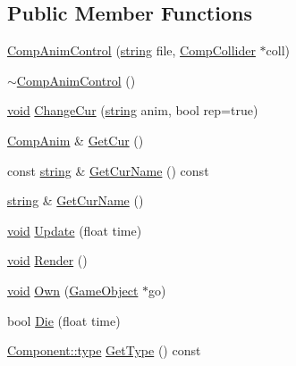 \subsection*{Public Member Functions}
\begin{DoxyCompactItemize}
\item 
\hyperlink{class_comp_anim_control_a973d5ec96115727a84968388bcbe7b7c}{Comp\-Anim\-Control} (\hyperlink{_s_d_l__opengl__glext_8h_ae84541b4f3d8e1ea24ec0f466a8c568b}{string} file, \hyperlink{class_comp_collider}{Comp\-Collider} $\ast$coll)
\item 
\hyperlink{class_comp_anim_control_a6786dbe926d75c85dd4e8bc89ba6525a}{$\sim$\-Comp\-Anim\-Control} ()
\item 
\hyperlink{_s_d_l__opengles2__gl2ext_8h_ae5d8fa23ad07c48bb609509eae494c95}{void} \hyperlink{class_comp_anim_control_a34e3519f9bedde639fdd4342da644d51}{Change\-Cur} (\hyperlink{_s_d_l__opengl__glext_8h_ae84541b4f3d8e1ea24ec0f466a8c568b}{string} anim, bool rep=true)
\item 
\hyperlink{class_comp_anim}{Comp\-Anim} \& \hyperlink{class_comp_anim_control_af094714708b9851b117dd6e3d837213b}{Get\-Cur} ()
\item 
const \hyperlink{_s_d_l__opengl__glext_8h_ae84541b4f3d8e1ea24ec0f466a8c568b}{string} \& \hyperlink{class_comp_anim_control_aab22a377f8848fe448d801e4d23266f2}{Get\-Cur\-Name} () const 
\item 
\hyperlink{_s_d_l__opengl__glext_8h_ae84541b4f3d8e1ea24ec0f466a8c568b}{string} \& \hyperlink{class_comp_anim_control_a4d1597b040731483f5d744feac77f19a}{Get\-Cur\-Name} ()
\item 
\hyperlink{_s_d_l__opengles2__gl2ext_8h_ae5d8fa23ad07c48bb609509eae494c95}{void} \hyperlink{class_comp_anim_control_a30942bb6ac00771fe7c517ea64096d65}{Update} (float time)
\item 
\hyperlink{_s_d_l__opengles2__gl2ext_8h_ae5d8fa23ad07c48bb609509eae494c95}{void} \hyperlink{class_comp_anim_control_a2b23ff1dc6a0748ed5a7fadb07bb8bbb}{Render} ()
\item 
\hyperlink{_s_d_l__opengles2__gl2ext_8h_ae5d8fa23ad07c48bb609509eae494c95}{void} \hyperlink{class_comp_anim_control_a5a4ad75cc577d413fdaa4753d64e8d8c}{Own} (\hyperlink{class_game_object}{Game\-Object} $\ast$go)
\item 
bool \hyperlink{class_comp_anim_control_a88db8f36cc8a393770bb71d743a296e2}{Die} (float time)
\item 
\hyperlink{class_component_ad6d161b6acf7b843b55bb9feac7af71a}{Component\-::type} \hyperlink{class_comp_anim_control_adaed169358aac3d66d8d543ca36817c4}{Get\-Type} () const 
\end{DoxyCompactItemize}
